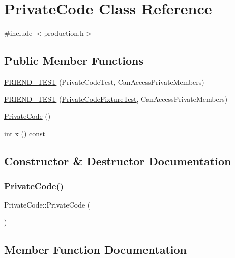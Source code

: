 \hypertarget{classPrivateCode}{}\section{Private\+Code Class Reference}
\label{classPrivateCode}


{\ttfamily \#include $<$production.\+h$>$}

\subsection*{Public Member Functions}
\begin{DoxyCompactItemize}
\item 
\mbox{\hyperlink{classPrivateCode_a9a74a333501232539ab1636f0928d8f2}{F\+R\+I\+E\+N\+D\+\_\+\+T\+E\+ST}} (Private\+Code\+Test, Can\+Access\+Private\+Members)
\item 
\mbox{\hyperlink{classPrivateCode_a29b6823300f68d78691476eeeaed8a7c}{F\+R\+I\+E\+N\+D\+\_\+\+T\+E\+ST}} (\mbox{\hyperlink{gtest__prod__test_8cc_a89debba10c803e339ce0f9b0b34a2267}{Private\+Code\+Fixture\+Test}}, Can\+Access\+Private\+Members)
\item 
\mbox{\hyperlink{classPrivateCode_affe538411a99919d24ef09dffe1bb3eb}{Private\+Code}} ()
\item 
int \mbox{\hyperlink{classPrivateCode_a247781246ce4d0c66563eaa39ba5aaa9}{x}} () const
\end{DoxyCompactItemize}


\subsection{Constructor \& Destructor Documentation}
\mbox{\label{classPrivateCode_affe538411a99919d24ef09dffe1bb3eb}} 
\subsubsection{\texorpdfstring{PrivateCode()}{PrivateCode()}}
{\footnotesize\ttfamily Private\+Code\+::\+Private\+Code (\begin{DoxyParamCaption}{ }\end{DoxyParamCaption})}



\subsection{Member Function Documentation}
\mbox{\label{classPrivateCode_a9a74a333501232539ab1636f0928d8f2}} 
